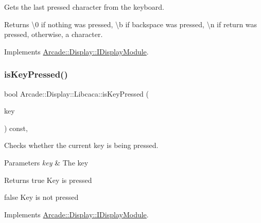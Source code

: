 Gets the last pressed character from the keyboard. 

\begin{DoxyReturn}{Returns}
\textbackslash{}0 if nothing was pressed, \textbackslash{}b if backspace was pressed, \textbackslash{}n if return was pressed, otherwise, a character. 
\end{DoxyReturn}


Implements \mbox{\hyperlink{classArcade_1_1Display_1_1IDisplayModule_a403f8a0f065dad707a881ef3cee79805}{Arcade\+::\+Display\+::\+I\+Display\+Module}}.

\mbox{\label{classArcade_1_1Display_1_1Libcaca_aad274dc246f3140fe623bbd3b260da07}} 
\subsubsection{\texorpdfstring{isKeyPressed()}{isKeyPressed()}}
{\footnotesize\ttfamily bool Arcade\+::\+Display\+::\+Libcaca\+::is\+Key\+Pressed (\begin{DoxyParamCaption}\item[{\mbox{\hyperlink{classArcade_1_1Display_1_1IDisplayModule_a8da3f6b309ca0581473ae8cc8789b619}{I\+Display\+Module\+::\+Keys}}}]{key }\end{DoxyParamCaption}) const\hspace{0.3cm}{\ttfamily [final]}, {\ttfamily [virtual]}}



Checks whether the current key is being pressed. 


\begin{DoxyParams}{Parameters}
{\em key} & The key \\
\hline
\end{DoxyParams}
\begin{DoxyReturn}{Returns}
true Key is pressed 

false Key is not pressed 
\end{DoxyReturn}


Implements \mbox{\hyperlink{classArcade_1_1Display_1_1IDisplayModule_af871661ff84c21581cd7233ba6f27aa0}{Arcade\+::\+Display\+::\+I\+Display\+Module}}.

\mbox{\label{classArcade_1_1Display_1_1Libcaca_a8b7cc724a0aad2647938f80a167e0d33}} 
